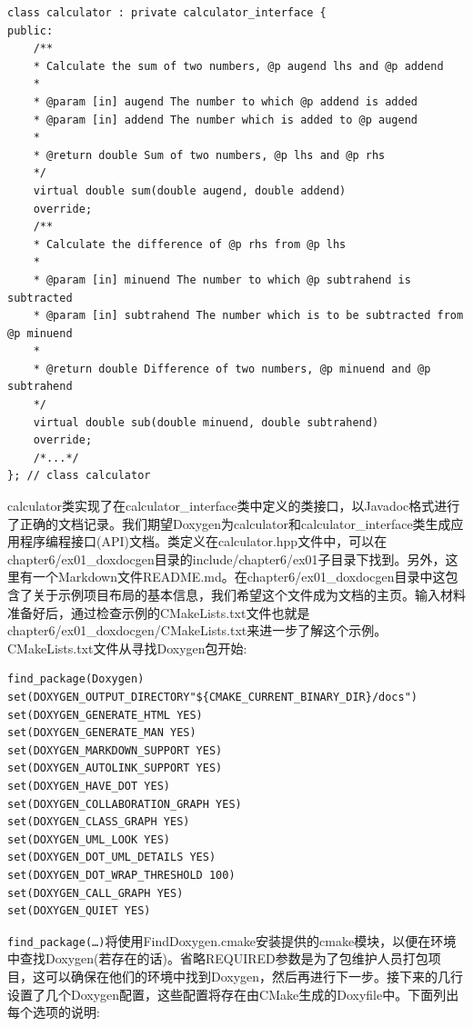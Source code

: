 \begin{lstlisting}[style=styleCXX]
class calculator : private calculator_interface {
public:
	/**
	* Calculate the sum of two numbers, @p augend lhs and @p addend
	*
	* @param [in] augend The number to which @p addend is added
	* @param [in] addend The number which is added to @p augend
	*
	* @return double Sum of two numbers, @p lhs and @p rhs
	*/
	virtual double sum(double augend, double addend)
	override;
	/**
	* Calculate the difference of @p rhs from @p lhs
	*
	* @param [in] minuend The number to which @p subtrahend is subtracted
	* @param [in] subtrahend The number which is to be subtracted from @p minuend
	*
	* @return double Difference of two numbers, @p minuend and @p subtrahend
	*/
	virtual double sub(double minuend, double subtrahend)
	override;
	/*...*/
}; // class calculator
\end{lstlisting}

calculator类实现了在calculator\_interface类中定义的类接口，以Javadoc格式进行了正确的文档记录。我们期望Doxygen为calculator和calculator\_interface类生成应用程序编程接口(API)文档。类定义在calculator.hpp文件中，可以在chapter6/ex01\_doxdocgen目录的include/chapter6/ex01子目录下找到。另外，这里有一个Markdown文件README.md。在chapter6/ex01\_doxdocgen目录中这包含了关于示例项目布局的基本信息，我们希望这个文件成为文档的主页。输入材料准备好后，通过检查示例的CMakeLists.txt文件也就是chapter6/ex01\_doxdocgen/CMakeLists.txt来进一步了解这个示例。CMakeLists.txt文件从寻找Doxygen包开始:

\begin{lstlisting}[style=styleCMake]
find_package(Doxygen)
set(DOXYGEN_OUTPUT_DIRECTORY"${CMAKE_CURRENT_BINARY_DIR}/docs")
set(DOXYGEN_GENERATE_HTML YES)
set(DOXYGEN_GENERATE_MAN YES)
set(DOXYGEN_MARKDOWN_SUPPORT YES)
set(DOXYGEN_AUTOLINK_SUPPORT YES)
set(DOXYGEN_HAVE_DOT YES)
set(DOXYGEN_COLLABORATION_GRAPH YES)
set(DOXYGEN_CLASS_GRAPH YES)
set(DOXYGEN_UML_LOOK YES)
set(DOXYGEN_DOT_UML_DETAILS YES)
set(DOXYGEN_DOT_WRAP_THRESHOLD 100)
set(DOXYGEN_CALL_GRAPH YES)
set(DOXYGEN_QUIET YES)
\end{lstlisting}

\texttt{find\_package(…)}将使用FindDoxygen.cmake安装提供的cmake模块，以便在环境中查找Doxygen(若存在的话)。省略REQUIRED参数是为了包维护人员打包项目，这可以确保在他们的环境中找到Doxygen，然后再进行下一步。接下来的几行设置了几个Doxygen配置，这些配置将存在由CMake生成的Doxyfile中。下面列出每个选项的说明:

